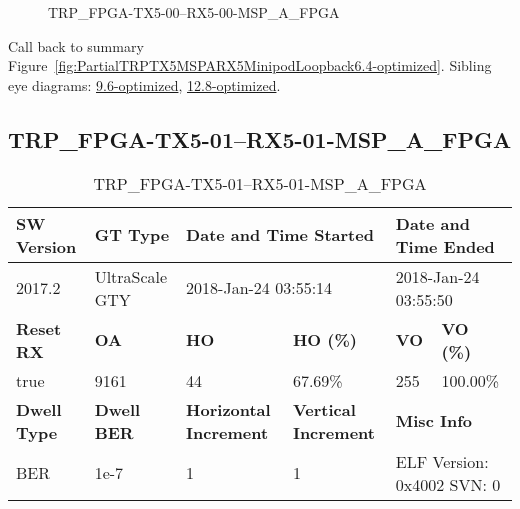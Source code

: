 \begin{figure}[h]
\caption{TRP\_FPGA-TX5-00--RX5-00-MSP\_A\_FPGA} \label{fig:TRPFPGATX500RX500MSPAFPGA6.4-optimized}
\end{figure}

Call back to summary Figure~\ref{fig:PartialTRPTX5MSPARX5MinipodLoopback6.4-optimized}.
Sibling eye diagrams: \hyperref[sec:TRPFPGATX500RX500MSPAFPGA9.6-optimized]{9.6-optimized}, \hyperref[sec:TRPFPGATX500RX500MSPAFPGA12.8-optimized]{12.8-optimized}.

\clearpage
\newpage


\subsection{TRP\_FPGA-TX5-01--RX5-01-MSP\_A\_FPGA}\label{sec:TRPFPGATX501RX501MSPAFPGA6.4-optimized}

\begin{table}[h]
\centering
\caption{TRP\_FPGA-TX5-01--RX5-01-MSP\_A\_FPGA}
\label{tab:TRPFPGATX501RX501MSPAFPGA6.4-optimized}
\begin{tabular}{@{}|l|l|l|l|l|l|@{}}
\toprule
\textbf{SW Version}                & \textbf{GT Type}   & \multicolumn{2}{l|}{\textbf{Date and Time Started}}            & \multicolumn{2}{l|}{\textbf{Date and Time Ended}}        \\ \midrule
2017.2                       & UltraScale GTY          & \multicolumn{2}{l|}{2018-Jan-24 03:55:14}                   & \multicolumn{2}{l|}{2018-Jan-24 03:55:50}               \\ \midrule
\textbf{Reset RX}                  & \textbf{OA} & \textbf{HO}   & \textbf{HO (\%)} & \textbf{VO} & \textbf{VO (\%)} \\ \midrule
true & 9161        & 44          & 67.69\%        & 255        & 100.00\%       \\ \midrule
\textbf{Dwell Type}                & \textbf{Dwell BER} & \textbf{Horizontal Increment} & \textbf{Vertical Increment}    & \multicolumn{2}{l|}{\textbf{Misc Info}}                  \\ \midrule
BER                            & 1e-7        & 1        & 1           & \multicolumn{2}{l|}{ELF Version: 0x4002 SVN: 0}                         \\ \bottomrule
\end{tabular}
\end{table}

